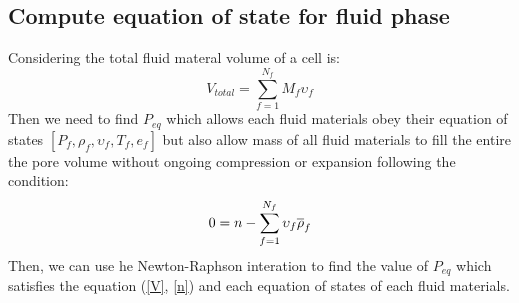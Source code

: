\documentclass[preprint,12pt]{elsarticle}
\begin{document}
\subsection{\textsf{Compute equation of state for fluid phase}}
Considering the total fluid materal volume of a cell is:
%
%
\begin{equation}
\label{V}
    V_{total} = \sum_{f=1}^{N_f} M_f \upsilon_f 
\end {equation}
%
%
Then we need to find $P_{eq}$ which allows each fluid materials obey their equation of states $[P_f, \rho_f, \upsilon_f, T_f, e_f]$ but also allow mass of all fluid materials to fill the entire the pore volume without ongoing compression or expansion following the condition:
%
%
\begin{equation}
    0 = n - \sum_{f=1}^{N_f} \upsilon_f \overline{\rho}_f\\
\label{n}
\end {equation}
%
%
Then, we can use he Newton-Raphson interation to find the value of $P_{eq}$ which satisfies the equation (\ref{V}, \ref{n}) and each equation of states of each fluid materials.
\end{document}
